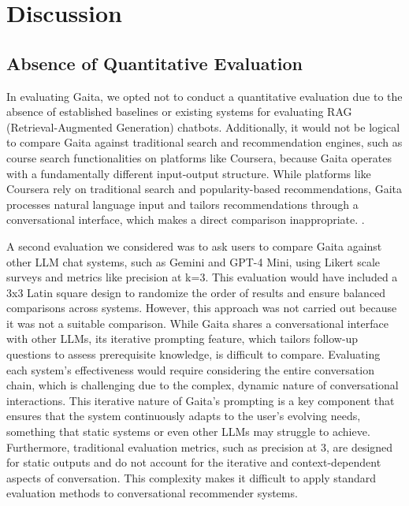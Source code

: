 \chapter{Discussion} \label{chap:chap-6}

\section{Absence of Quantitative Evaluation}

In evaluating Gaita, we opted not to conduct a quantitative evaluation due to the absence of established baselines or existing systems for evaluating RAG (Retrieval-Augmented Generation) chatbots. Additionally, it would not be logical to compare Gaita against traditional search and recommendation engines, such as course search functionalities on platforms like Coursera, because Gaita operates with a fundamentally different input-output structure. While platforms like Coursera rely on traditional search and popularity-based recommendations, Gaita processes natural language input and tailors recommendations through a conversational interface, which makes a direct comparison inappropriate. \footnotemark[1].

A second evaluation we considered was to ask users to compare Gaita against other LLM chat systems, such as Gemini and GPT-4 Mini, using Likert scale surveys and metrics like precision at k=3. This evaluation would have included a 3x3 Latin square design to randomize the order of results and ensure balanced comparisons across systems. However, this approach was not carried out because it was not a suitable comparison. While Gaita shares a conversational interface with other LLMs, its iterative prompting feature, which tailors follow-up questions to assess prerequisite knowledge, is difficult to compare. Evaluating each system’s effectiveness would require considering the entire conversation chain, which is challenging due to the complex, dynamic nature of conversational interactions. This iterative nature of Gaita’s prompting is a key component that ensures that the system continuously adapts to the user’s evolving needs, something that static systems or even other LLMs may struggle to achieve. Furthermore, traditional evaluation metrics, such as precision at 3, are designed for static outputs and do not account for the iterative and context-dependent aspects of conversation. This complexity makes it difficult to apply standard evaluation methods to conversational recommender systems. 

